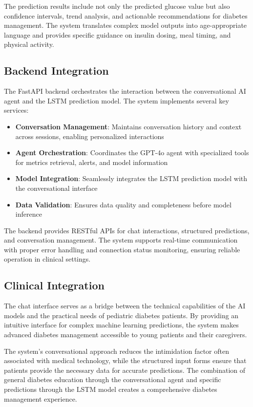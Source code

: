 \documentclass[acmsmall]{acmart}
\begin{document}
The prediction results include not only the predicted glucose value but also confidence intervals, trend analysis, and actionable recommendations for diabetes management. The system translates complex model outputs into age-appropriate language and provides specific guidance on insulin dosing, meal timing, and physical activity.

\subsection{Backend Integration}

The FastAPI backend orchestrates the interaction between the conversational AI agent and the LSTM prediction model. The system implements several key services:

\begin{itemize}
  \item \textbf{Conversation Management}: Maintains conversation history and context across sessions, enabling personalized interactions
  \item \textbf{Agent Orchestration}: Coordinates the GPT-4o agent with specialized tools for metrics retrieval, alerts, and model information
  \item \textbf{Model Integration}: Seamlessly integrates the LSTM prediction model with the conversational interface
  \item \textbf{Data Validation}: Ensures data quality and completeness before model inference
\end{itemize}

The backend provides RESTful APIs for chat interactions, structured predictions, and conversation management. The system supports real-time communication with proper error handling and connection status monitoring, ensuring reliable operation in clinical settings.

\subsection{Clinical Integration}

The chat interface serves as a bridge between the technical capabilities of the AI models and the practical needs of pediatric diabetes patients. By providing an intuitive interface for complex machine learning predictions, the system makes advanced diabetes management accessible to young patients and their caregivers.

The system's conversational approach reduces the intimidation factor often associated with medical technology, while the structured input forms ensure that patients provide the necessary data for accurate predictions. The combination of general diabetes education through the conversational agent and specific predictions through the LSTM model creates a comprehensive diabetes management experience.
\end{document}
